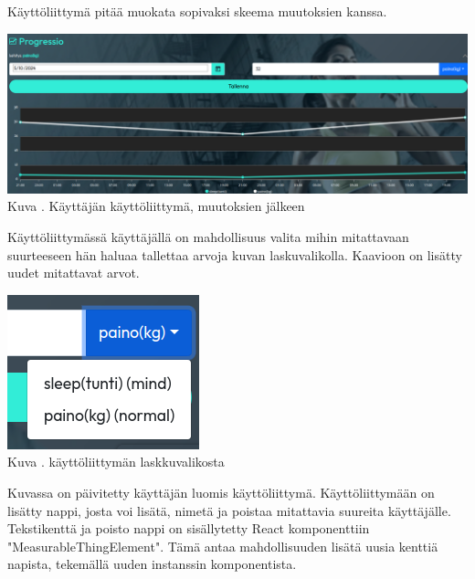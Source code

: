 Käyttöliittymä pitää muokata sopivaksi skeema muutoksien kanssa. 
\bigskip


\includegraphics[width = 15cm]{src/public/progressmulti.png}\\
Kuva \getImgCount {}. Käyttäjän käyttöliittymä, muutoksien jälkeen 
\medskip

Käyttöliittymässä käyttäjällä on mahdollisuus valita mihin mitattavaan suurteeseen hän haluaa tallettaa arvoja kuvan \nextImageCount{} laskuvalikolla.
Kaavioon on lisätty uudet mitattavat arvot. 
\bigskip

\includegraphics{src/public/progressselect.png}\\
Kuva \getImgCount {}. käyttöliittymän laskkuvalikosta
\medskip



Kuvassa \nextImageCount {} on päivitetty käyttäjän luomis käyttöliittymä.
Käyttöliittymään on lisätty nappi, josta voi lisätä, nimetä ja poistaa mitattavia suureita käyttäjälle.
Tekstikenttä ja poisto nappi on sisällytetty React komponenttiin "MeasurableThingElement". 
Tämä antaa mahdollisuuden lisätä uusia kenttiä napista, tekemällä uuden instanssin komponentista.
%

